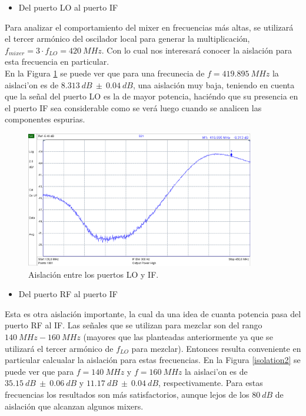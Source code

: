 \documentclass[a4paper,10pt]{article}
\begin{document}
	\begin{itemize}
		\item Del puerto LO al puerto IF
	\end{itemize}
	
	\indent Para analizar el comportamiento del mixer en frecuencias m\'as 
	altas, se utilizar\'a el tercer arm\'onico del oscilador local para generar 
	la multiplicaci\'on, $f_{mixer}=3\cdot f_{LO}=420~MHz$. Con lo cual nos 
	interesar\'a conocer la aislaci\'on para esta frecuencia en particular. \\
	\indent En la Figura \ref{isolation1} se puede ver que para una frecunecia 
	de $f=419.895~MHz$ la aislaci'on es de $8.313~dB~\pm~0.04~dB$, una 
	aislaci\'on muy baja, teniendo en cuenta que la se\~nal del puerto LO es la 
	de mayor potencia, haci\'endo que su presencia en el puerto IF sea 
	considerable como se ver\'a luego cuando se analicen las componentes 
	espurias.
	
	\begin{figure}[!htb]
		\centering
		\includegraphics[width=10cm]{Images/aislacion1.png}
		\caption{Aislaci\'on entre los puertos LO y IF.}
		\label{isolation1}
	\end{figure}	
	
	\begin{itemize}
		\item Del puerto RF al puerto IF
	\end{itemize}
	
	\indent Esta es otra aislaci\'on importante, la cual da una idea de cuanta 
	potencia pasa del puerto RF al IF. Las se\~nales que se utilizan para 
	mezclar son del rango $140~MHz-160~MHz$ (mayores que las planteadas 
	anteriormente ya que se utilizar\'a el tercer arm\'onico de 
	$f_{LO}$ para mezclar). Entonces resulta conveniente en particular calcualar
	la aislaci\'on para estas frecuencias. En la Figura \ref{isolation2} se 
	puede ver que para $f=140~MHz$ y $f=160~MHz$ la aislaci'on es de 
	$35.15~dB~\pm~0.06~dB$ y $11.17~dB~\pm~0.04~dB$, respectivamente. Para 
	estas frecuencias los resultados son m\'as satisfactorios, aunque lejos de 
	los $80~dB$ de aislaci\'on que alcanzan algunos mixers.
	
\end{document}
